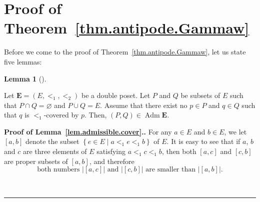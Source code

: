 \documentclass[numbers=enddot,12pt,final,onecolumn,notitlepage,abstracton]{scrartcl}%
\theoremstyle{definition}
\newtheorem{lem}[theo]{Lemma}
\newenvironment{lemma}[1][]
{\begin{lem}[#1]\begin{leftbar}}
{\end{leftbar}\end{lem}}
\newenvironment{proof}[1][Proof]{\noindent\textbf{#1.} }{\ \rule{0.5em}{0.5em}}
\newcommand{\Adm}{\operatorname{Adm}}
\newcommand{\EE}{{\mathbf{E}}}
\begin{document}
\section{Proof of Theorem~\ref{thm.antipode.Gammaw}}
\label{sect.proof}

Before we come to the proof of Theorem~\ref{thm.antipode.Gammaw},
let us state five lemmas:

\begin{lemma}
\label{lem.admissible.cover}
Let $\EE = \left(E, <_1, <_2\right)$ be a double poset.
Let $P$ and $Q$ be subsets of $E$ such that
$P \cap Q = \varnothing$ and $P \cup Q = E$.
Assume that there exist no $p \in P$ and $q \in Q$ such that
$q$ is $<_1$-covered by $p$. Then, $\left(P, Q\right) \in
\Adm \EE$.
\end{lemma}

\begin{proof}[Proof of Lemma~\ref{lem.admissible.cover}.]
For any $a \in E$ and $b \in E$, we let $\left[a, b\right]$
denote the subset \newline
$\left\{e \in E \mid a <_1 e <_1 b\right\}$ of $E$. It is
easy to see that if $a$, $b$ and $c$ are three elements of
$E$ satisfying $a <_1 c <_1 b$, then
both $\left[a, c\right]$ and $\left[c, b\right]$ are proper
subsets of $\left[a, b\right]$, and therefore
\begin{equation}
\text{both numbers }
\left|\left[a, c\right]\right| \text{ and }
\left|\left[c, b\right]\right| \text{ are smaller than }
\left|\left[a, b\right]\right|.
\label{pf.lem.admissible.cover.1}
\end{equation}


\end{proof}
\end{document}
